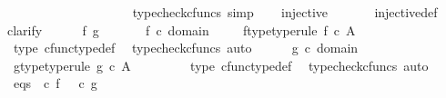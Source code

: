 \begin{isabellebody}
\ \ \ \ \ \ \ \ \ \ \ \ \ \ \ \ \ \ \isamarkupfalse%
\ {\isacharparenleft}{\kern0pt}typecheck{\isacharunderscore}{\kern0pt}cfuncs{\isacharcomma}{\kern0pt}\ simp{\isacharparenright}{\kern0pt}\isanewline
\ \ \isamarkupfalse%
\ {\isachardoublequoteopen}injective\ {\isasymphi}{\isachardoublequoteclose}\isanewline
\ \ \ \ \isamarkupfalse%
\ injective{\isacharunderscore}{\kern0pt}def\isanewline
\ \ \isamarkupfalse%
{\isacharparenleft}{\kern0pt}clarify{\isacharparenright}{\kern0pt}\isanewline
\ \ \ \ \isamarkupfalse%
\ f\ g\ \isanewline
\ \ \ \ \isamarkupfalse%
\ {\isachardoublequoteopen}f\ {\isasymin}\isactrlsub c\ domain\ {\isasymphi}{\isachardoublequoteclose}\ \isamarkupfalse%
\ \isamarkupfalse%
\ f{\isacharunderscore}{\kern0pt}type{\isacharbrackleft}{\kern0pt}type{\isacharunderscore}{\kern0pt}rule{\isacharbrackright}{\kern0pt}{\isacharcolon}{\kern0pt}\ {\isachardoublequoteopen}f\ {\isasymin}\isactrlsub c\ A\isactrlbsup {\isasymOmega}\isactrlesup {\isachardoublequoteclose}\ \isanewline
\ \ \ \ \ \ \isamarkupfalse%
\ {\isasymphi}{\isacharunderscore}{\kern0pt}type\ cfunc{\isacharunderscore}{\kern0pt}type{\isacharunderscore}{\kern0pt}def\ \isamarkupfalse%
\ {\isacharparenleft}{\kern0pt}typecheck{\isacharunderscore}{\kern0pt}cfuncs{\isacharcomma}{\kern0pt}\ auto{\isacharparenright}{\kern0pt}\isanewline
\ \ \ \ \isamarkupfalse%
\ {\isachardoublequoteopen}g\ {\isasymin}\isactrlsub c\ domain\ {\isasymphi}{\isachardoublequoteclose}\ \isamarkupfalse%
\ \isamarkupfalse%
\ g{\isacharunderscore}{\kern0pt}type{\isacharbrackleft}{\kern0pt}type{\isacharunderscore}{\kern0pt}rule{\isacharbrackright}{\kern0pt}{\isacharcolon}{\kern0pt}\ {\isachardoublequoteopen}g\ {\isasymin}\isactrlsub c\ A\isactrlbsup {\isasymOmega}\isactrlesup {\isachardoublequoteclose}\ \isanewline
\ \ \ \ \ \ \isamarkupfalse%
\ {\isasymphi}{\isacharunderscore}{\kern0pt}type\ cfunc{\isacharunderscore}{\kern0pt}type{\isacharunderscore}{\kern0pt}def\ \isamarkupfalse%
\ {\isacharparenleft}{\kern0pt}typecheck{\isacharunderscore}{\kern0pt}cfuncs{\isacharcomma}{\kern0pt}\ auto{\isacharparenright}{\kern0pt}\isanewline
\ \ \ \ \isamarkupfalse%
\ eqs{\isacharcolon}{\kern0pt}\ {\isachardoublequoteopen}{\isasymphi}\ {\isasymcirc}\isactrlsub c\ f\ {\isacharequal}{\kern0pt}\ {\isasymphi}\ {\isasymcirc}\isactrlsub c\ g{\isachardoublequoteclose}\isanewline

\end{isabellebody}
